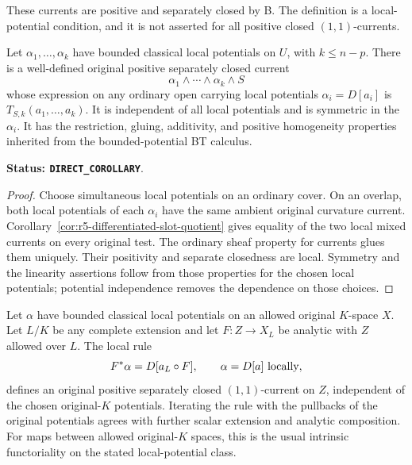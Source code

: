These currents are positive and separately closed by B.
The definition is a local-potential condition, and it is not
asserted for all positive closed $(1,1)$-currents.

\begin{corollary}
\label{cor:r5-local-potential-current-products}
Let $\alpha_1,\ldots,\alpha_k$ have bounded classical local
potentials on $U$, with $k\leq n-p$. There is a well-defined
original positive separately closed current
\[
                        \alpha_1\wedge\cdots\wedge\alpha_k\wedge S
\]
whose expression on any ordinary open carrying local potentials
$\alpha_i=D[a_i]$ is $T_{S,k}(a_1,\ldots,a_k)$.
It is independent of all local potentials and is symmetric
in the $\alpha_i$. It has the restriction, gluing, additivity,
and positive homogeneity properties inherited from the
bounded-potential BT calculus.
\end{corollary}

\noindent\textbf{Status: \texttt{DIRECT\_COROLLARY}}.

\begin{proof}
Choose simultaneous local potentials on an ordinary cover.
On an overlap, both local potentials of each $\alpha_i$
have the same ambient original curvature current.
Corollary~\ref{cor:r5-differentiated-slot-quotient} gives equality
of the two local mixed currents on every original test.
The ordinary sheaf property for currents glues them uniquely.
Their positivity and separate closedness are local.
Symmetry and the linearity assertions follow from those
properties for the chosen local potentials; potential
independence removes the dependence on those choices.
\end{proof}

\begin{corollary}
\label{cor:r5-potential-current-pullback}
Let $\alpha$ have bounded classical local potentials on an
allowed original $K$-space $X$. Let $L/K$ be any complete
extension and let $F:Z\to X_L$ be analytic with $Z$ allowed
over $L$. The local rule
\[
                      F^*\alpha=D[a_L\circ F],
                \qquad \alpha=D[a]\ \hbox{locally},
\]
defines an original positive separately closed $(1,1)$-current
on $Z$, independent of the chosen original-$K$ potentials.
Iterating the rule with the pullbacks of the original potentials
agrees with further scalar extension and analytic composition.
For maps between allowed original-$K$ spaces, this is the usual
intrinsic functoriality on the stated local-potential class.
\end{corollary}

